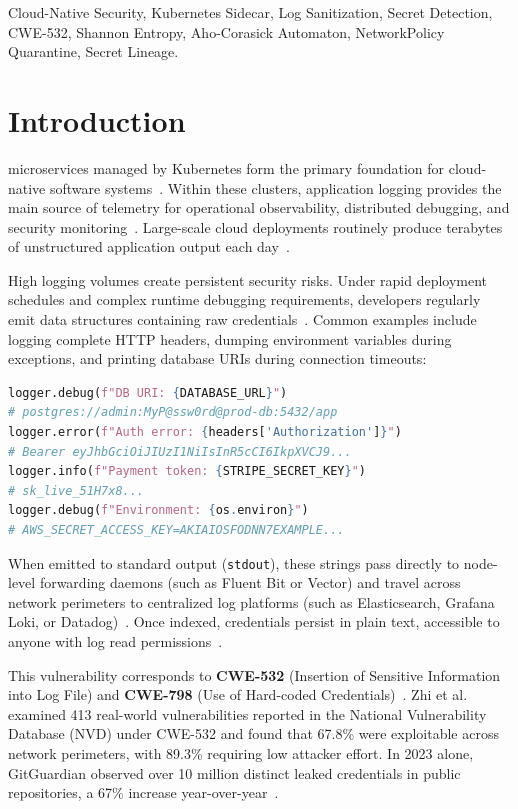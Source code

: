 \documentclass[conference]{IEEEtran}
\begin{document}
\begin{IEEEkeywords}
Cloud-Native Security, Kubernetes Sidecar, Log Sanitization, Secret Detection, CWE-532, Shannon Entropy, Aho-Corasick Automaton, NetworkPolicy Quarantine, Secret Lineage.
\end{IEEEkeywords}

\section{Introduction}
 microservices managed by Kubernetes form the primary foundation for cloud-native software systems~\cite{k8s_docs}. Within these clusters, application logging provides the main source of telemetry for operational observability, distributed debugging, and security monitoring~\cite{barik2016bones, aghili2025protecting}. Large-scale cloud deployments routinely produce terabytes of unstructured application output each day~\cite{datadog2023logging}.

High logging volumes create persistent security risks. Under rapid deployment schedules and complex runtime debugging requirements, developers regularly emit data structures containing raw credentials~\cite{zhi2020preliminary, ahmed2025secret}. Common examples include logging complete HTTP headers, dumping environment variables during exceptions, and printing database URIs during connection timeouts:
\begin{lstlisting}[language=Python]
logger.debug(f"DB URI: {DATABASE_URL}") 
# postgres://admin:MyP@ssw0rd@prod-db:5432/app
logger.error(f"Auth error: {headers['Authorization']}") 
# Bearer eyJhbGciOiJIUzI1NiIsInR5cCI6IkpXVCJ9...
logger.info(f"Payment token: {STRIPE_SECRET_KEY}") 
# sk_live_51H7x8...
logger.debug(f"Environment: {os.environ}") 
# AWS_SECRET_ACCESS_KEY=AKIAIOSFODNN7EXAMPLE...
\end{lstlisting}

When emitted to standard output (\texttt{stdout}), these strings pass directly to node-level forwarding daemons (such as Fluent Bit or Vector) and travel across network perimeters to centralized log platforms (such as Elasticsearch, Grafana Loki, or Datadog)~\cite{portillo2020safelog}. Once indexed, credentials persist in plain text, accessible to anyone with log read permissions~\cite{khoje2023securing}.

This vulnerability corresponds to \textbf{CWE-532} (Insertion of Sensitive Information into Log File) and \textbf{CWE-798} (Use of Hard-coded Credentials)~\cite{mitre2022cwe}. Zhi et al.~\cite{zhi2020preliminary} examined 413 real-world vulnerabilities reported in the National Vulnerability Database (NVD) under CWE-532 and found that 67.8\% were exploitable across network perimeters, with 89.3\% requiring low attacker effort. In 2023 alone, GitGuardian observed over 10 million distinct leaked credentials in public repositories, a 67\% increase year-over-year~\cite{gitguardian2024sprawl}.
\end{document}

